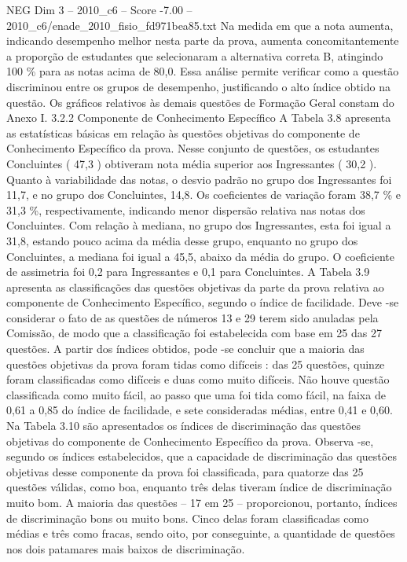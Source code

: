 \begin{textsample}{NEG Dim 3 – 2010\_c6 – Score -7.00 – 2010\_c6/enade\_2010\_fisio\_fd971bea85.txt}
Na medida em que a nota aumenta, indicando desempenho melhor nesta parte da prova, aumenta concomitantemente a proporção de estudantes que selecionaram a alternativa correta B, atingindo 100 \% para as notas acima de 80,0.
Essa análise permite verificar como a questão discriminou entre os grupos de desempenho, justificando o alto índice obtido na questão.
Os gráficos relativos às demais questões de Formação Geral constam do Anexo I. 3.2.2 Componente de Conhecimento Específico A Tabela 3.8 apresenta as estatísticas básicas em relação às questões objetivas do componente de Conhecimento Específico da prova.
Nesse conjunto de questões, os estudantes Concluintes ( 47,3 ) obtiveram nota média superior aos Ingressantes ( 30,2 ).
Quanto à variabilidade das notas, o desvio padrão no grupo dos Ingressantes foi 11,7, e no grupo dos Concluintes, 14,8.
Os coeficientes de variação foram 38,7 \% e 31,3 \%, respectivamente, indicando menor dispersão relativa nas notas dos Concluintes.
Com relação à mediana, no grupo dos Ingressantes, esta foi igual a 31,8, estando pouco acima da média desse grupo, enquanto no grupo dos Concluintes, a mediana foi igual a 45,5, abaixo da média do grupo.
O coeficiente de assimetria foi 0,2 para Ingressantes e 0,1 para Concluintes.
A Tabela 3.9 apresenta as classificações das questões objetivas da parte da prova relativa ao componente de Conhecimento Específico, segundo o índice de facilidade.
Deve -se considerar o fato de as questões de números 13 e 29 terem sido anuladas pela Comissão, de modo que a classificação foi estabelecida com base em 25 das 27 questões.
A partir dos índices obtidos, pode -se concluir que a maioria das questões objetivas da prova foram tidas como difíceis : das 25 questões, quinze foram classificadas como difíceis e duas como muito difíceis.
Não houve questão classificada como muito fácil, ao passo que uma foi tida como fácil, na faixa de 0,61 a 0,85 do índice de facilidade, e sete consideradas médias, entre 0,41 e 0,60.
Na Tabela 3.10 são apresentados os índices de discriminação das questões objetivas do componente de Conhecimento Específico da prova.
Observa -se, segundo os índices estabelecidos, que a capacidade de discriminação das questões objetivas desse componente da prova foi classificada, para quatorze das 25 questões válidas, como boa, enquanto três delas tiveram índice de discriminação muito bom.
A maioria das questões – 17 em 25 – proporcionou, portanto, índices de discriminação bons ou muito bons.
Cinco delas foram classificadas como médias e três como fracas, sendo oito, por conseguinte, a quantidade de questões nos dois patamares mais baixos de discriminação.

\end{textsample}
